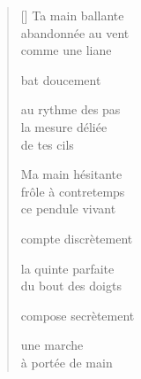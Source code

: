 \documentclass[11pt,a4paper]{article}
\begin{document}
\thispagestyle{empty}


\settowidth{\versewidth}{sur les lignes de paume}

\bigskip

\begin{verse}[\versewidth]
  Ta main ballante \\
  abandonnée au vent \\
  comme une liane

  bat doucement

  au rythme des pas \\
  la mesure déliée \\
  de tes cils

  Ma main hésitante \\
  frôle à contretemps \\
  ce pendule vivant

  compte discrètement

  la quinte parfaite \\
  du bout des doigts

  compose secrètement

  une marche \\
  à portée de main
\end{verse}
\end{document}
